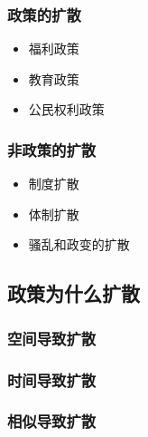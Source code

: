 \documentclass[
  12pt,
]{ctexart}
\begin{document}
\hypertarget{ux653fux7b56ux7684ux6269ux6563}{%
\subsubsection{政策的扩散}\label{ux653fux7b56ux7684ux6269ux6563}}

\begin{itemize}
\item
  福利政策
\item
  教育政策
\item
  公民权利政策
\end{itemize}

\hypertarget{ux975eux653fux7b56ux7684ux6269ux6563}{%
\subsubsection{非政策的扩散}\label{ux975eux653fux7b56ux7684ux6269ux6563}}

\begin{itemize}
\item
  制度扩散
\item
  体制扩散
\item
  骚乱和政变的扩散
\end{itemize}

\hypertarget{ux653fux7b56ux4e3aux4ec0ux4e48ux6269ux6563}{%
\subsection{政策为什么扩散}\label{ux653fux7b56ux4e3aux4ec0ux4e48ux6269ux6563}}

\hypertarget{ux7a7aux95f4ux5bfcux81f4ux6269ux6563}{%
\subsubsection{空间导致扩散}\label{ux7a7aux95f4ux5bfcux81f4ux6269ux6563}}

\hypertarget{ux65f6ux95f4ux5bfcux81f4ux6269ux6563}{%
\subsubsection{时间导致扩散}\label{ux65f6ux95f4ux5bfcux81f4ux6269ux6563}}

\hypertarget{ux76f8ux4f3cux5bfcux81f4ux6269ux6563}{%
\subsubsection{相似导致扩散}\label{ux76f8ux4f3cux5bfcux81f4ux6269ux6563}}
\end{document}
